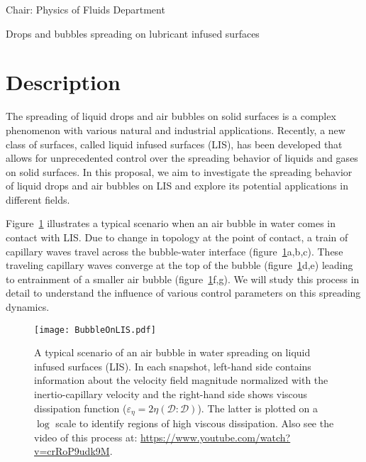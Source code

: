 \documentclass[a4paper,10pt]{article}
\begin{document}
\noindent Chair: Physics of Fluids Department
\begin{center}
 \begin{LARGE}
  Drops and bubbles spreading on lubricant infused surfaces
 \end{LARGE}
\end{center}

\section*{Description}

The spreading of liquid drops and air bubbles on solid surfaces is a complex phenomenon with various natural and industrial applications. Recently, a new class of surfaces, called liquid infused surfaces (LIS), has been developed that allows for unprecedented control over the spreading behavior of liquids and gases on solid surfaces. In this proposal, we aim to investigate the spreading behavior of liquid drops and air bubbles on LIS and explore its potential applications in different fields. 

Figure~\ref{Figure::Typical} illustrates a typical scenario when an air bubble in water comes in contact with LIS. Due to change in topology at the point of contact, a train of capillary waves travel across the bubble-water interface (figure~\ref{Figure::Typical}a,b,c). These traveling capillary waves converge at the top of the bubble (figure~\ref{Figure::Typical}d,e) leading to entrainment of a smaller air bubble (figure~\ref{Figure::Typical}f,g). We will study this process in detail to understand the influence of various control parameters on this spreading dynamics. 

\begin{figure}[H]
	\begin{center}
		\texttt{[image: BubbleOnLIS.pdf]}
		\caption{A typical scenario of an air bubble in water spreading on liquid infused surfaces (LIS). In each snapshot, left-hand side contains information about the velocity field magnitude normalized with the inertio-capillary velocity and the right-hand side shows viscous dissipation function ($\varepsilon_\eta = 2\eta\left(\boldsymbol{\mathcal{D}:\mathcal{D}}\right)$). The latter is plotted on a $\log$ scale to identify regions of high viscous dissipation. Also see the video of this process at: \href{https://www.youtube.com/watch?v=crRoP9udk9M}{https://www.youtube.com/watch?v=crRoP9udk9M}.}
		\label{Figure::Typical}
\end{center}
\end{figure}
\end{document}
